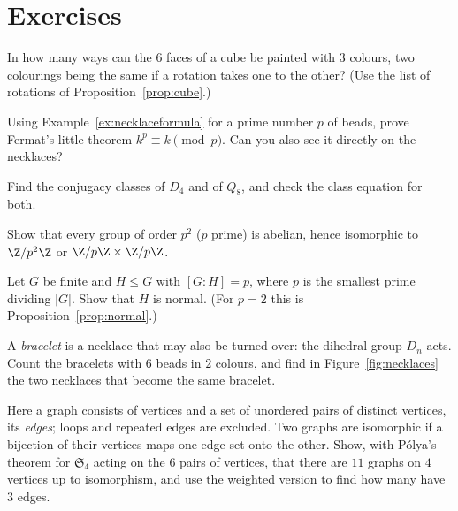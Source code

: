 \section{Exercises}

\begin{exercise}[$\star$]\label{ex:cubefaces}
In how many ways can the $6$ faces of a cube be painted with $3$ colours, two colourings being the same if a rotation takes one to the other? (Use the list of rotations of Proposition~\ref{prop:cube}.)
\end{exercise}

\begin{exercise}[$\star$]\label{ex:fermatnecklace}
Using Example~\ref{ex:necklaceformula} for a prime number $p$ of beads, prove Fermat's little theorem $k^p\equiv k\pmod p$. Can you also see it directly on the necklaces?
\end{exercise}

\begin{exercise}[$\star$]\label{ex:classesD}
Find the conjugacy classes of $D_4$ and of $Q_8$, and check the class equation for both.
\end{exercise}

\begin{exercise}[$\star\star$]\label{ex:p2}
Show that every group of order $p^2$ ($p$ prime) is abelian, hence isomorphic to $\Z/p^2\Z$ or $\Z/p\Z\times\Z/p\Z$.
\end{exercise}

\begin{exercise}[$\star\star$]\label{ex:smallestprime}
Let $G$ be finite and $H\le G$ with $[G:H]=p$, where $p$ is the smallest prime dividing $|G|$. Show that $H$ is normal. (For $p=2$ this is Proposition~\ref{prop:normal}.)
\end{exercise}

\begin{exercise}[$\star\star$]\label{ex:bracelets}
A \emph{bracelet} is a necklace that may also be turned over: the dihedral group $D_n$ acts. Count the bracelets with $6$ beads in $2$ colours, and find in Figure~\ref{fig:necklaces} the two necklaces that become the same bracelet.
\end{exercise}

\begin{exercise}[$\star\star$]\label{ex:graphs4}
Here a graph consists of vertices and a set of unordered pairs of distinct vertices, its \emph{edges}; loops and repeated edges are excluded. Two graphs are isomorphic if a bijection of their vertices maps one edge set onto the other. Show, with P\'olya's theorem for $\mathfrak S_4$ acting on the $6$ pairs of vertices, that there are $11$ graphs on $4$ vertices up to isomorphism, and use the weighted version to find how many have $3$ edges.
\end{exercise}

